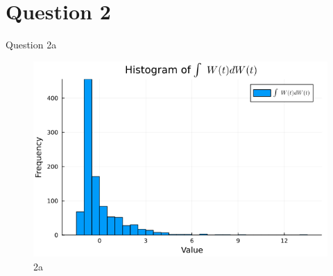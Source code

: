 \documentclass[compress,12pt]{beamer}
\begin{document}


\section{Question 2}
\begin{frame}{Question 2a}
      

      \begin{figure}[H]
            \centering
            \includegraphics[scale=0.5]{imgs/2a.png}
            \caption{2a}
            \label{fig:2a}
      \end{figure}

\end{frame}
\end{document}
